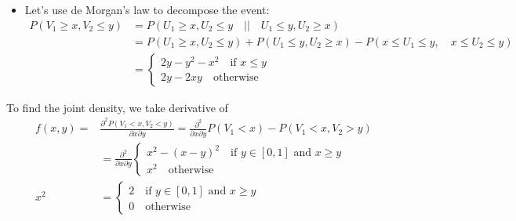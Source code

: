 \documentclass[../main]{subfiles}
\begin{document}
\begin{solution}
    \begin{itemize}
        \item Let's use de Morgan's law to decompose the event:
        \begin{align*}
            P(V_1 \geq x, V_2 \leq y) &= P(U_1 \ge x, U_2 \le y  \quad ||\quad  U_1 \leq y, U_2 \ge x)\\
            &=P(U_1 \ge x, U_2\le y) + P(U_1 \leq y, U_2 \ge x) - P(x\le U_1 \le y, \quad x\le U_2\le y)\\
            &= \begin{cases}
                2y-y^2-x^2 \quad \text{if $x\leq y$}\\
                2y-2xy \quad \text{otherwise}
            \end{cases}
        \end{align*}
    \end{itemize}
    To find the joint density, we take derivative of 
    \begin{align*}
        f(x,y)=&\frac{\partial^2 P(V_1 < x, V_2 < y)}{\partial x\partial y} = \frac{\partial^2}{\partial x\partial y} P(V_1< x) - P(V_1 < x, V_2>y)\\
        &= \frac{\partial^2}{\partial x\partial y} \begin{cases}
            x^2 - (x-y)^2 \quad \text{if $y\in[0,1]$ and $x\ge y$}\\
            x^2 \quad \text{otherwise}
        \end{cases}\\
        x^2 
        &= \begin{cases}
            2 \quad \text{if $y\in[0,1]$ and $x\ge y$}\\
            0 \quad \text{otherwise}
        \end{cases} 
    \end{align*}
\end{solution}
\end{document}

